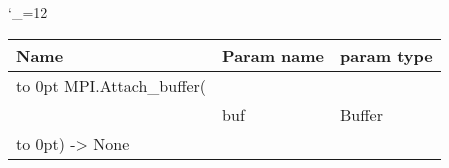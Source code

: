 \begingroup \catcode`\_=12 \tt
\begin{tabular}{lll}
\toprule
\textrm{Name}&\textrm{Param name}&\textrm{param type}\\
\midrule
\hbox to 0pt {MPI.Attach_buffer(\hss}\\
& buf & Buffer\\
\hbox to 0pt{) -> None\hss}\\
\bottomrule
\end{tabular}
\endgroup
